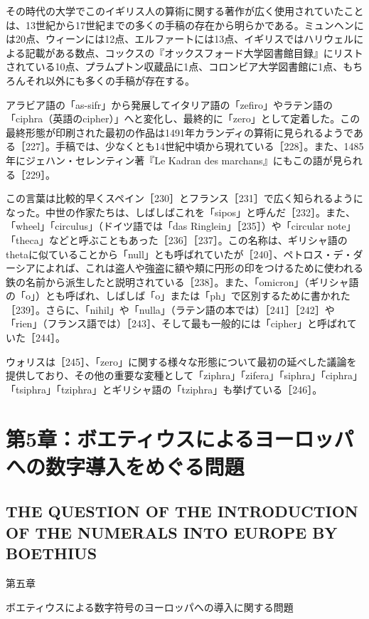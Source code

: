 \documentclass[a4paper,11pt,openany]{ltjsbook}
\begin{document}
その時代の大学でこのイギリス人の算術に関する著作が広く使用されていたことは、13世紀から17世紀までの多くの手稿の存在から明らかである。ミュンヘンには20点、ウィーンには12点、エルファートには13点、イギリスではハリウェルによる記載がある数点、コックスの『オックスフォード大学図書館目録』にリストされている10点、プラムプトン収蔵品に1点、コロンビア大学図書館に1点、もちろんそれ以外にも多くの手稿が存在する。

アラビア語の「as-sifr」から発展してイタリア語の「zefiro」やラテン語の「ciphra（英語のcipher）」へと変化し、最終的に「zero」として定着した。この最終形態が印刷された最初の作品は1491年カランディの算術に見られるようである［227］。手稿では、少なくとも14世紀中頃から現れている［228］。また、1485年にジェハン・セレンティン著『Le Kadran des marchans』にもこの語が見られる［229］。

この言葉は比較的早くスペイン［230］とフランス［231］で広く知られるようになった。中世の作家たちは、しばしばこれを「sipos」と呼んだ［232］。また、「wheel」「circulus」（ドイツ語では「das Ringlein」［235］）や「circular note」「theca」などと呼ぶこともあった［236］［237］。この名称は、ギリシャ語のthetaに似ていることから「null」とも呼ばれていたが［240］、ペトロス・デ・ダーシアによれば、これは盗人や強盗に額や頬に円形の印をつけるために使われる鉄の名前から派生したと説明されている［238］。また、「omicron」（ギリシャ語の「o」）とも呼ばれ、しばしば「o」または「ph」で区別するために書かれた［239］。さらに、「nihil」や「nulla」（ラテン語の本では）［241］［242］や「rien」（フランス語では）［243］、そして最も一般的には「cipher」と呼ばれていた［244］。

ウォリスは［245］、「zero」に関する様々な形態について最初の延べした議論を提供しており、その他の重要な変種として「ziphra」「zifera」「siphra」「ciphra」「tsiphra」「tziphra」とギリシャ語の「tziphra」も挙げている［246］。

\clearpage

\chapter{第5章：ボエティウスによるヨーロッパへの数字導入をめぐる問題}
\section*{THE QUESTION OF THE INTRODUCTION OF THE NUMERALS INTO EUROPE BY BOETHIUS}

第五章

ボエティウスによる数字符号のヨーロッパへの導入に関する問題
\end{document}
